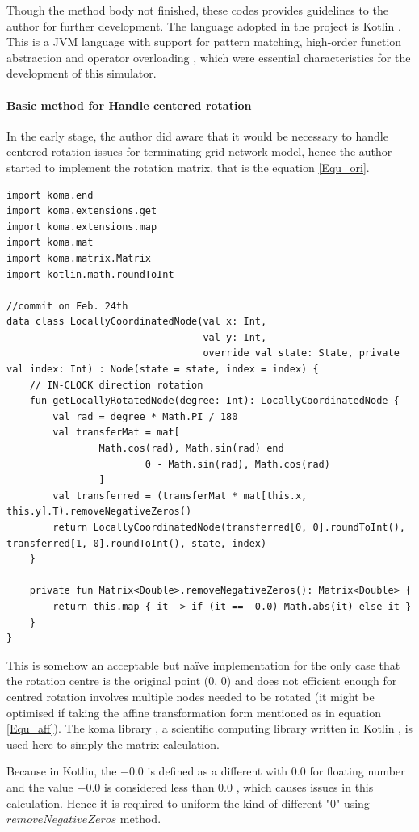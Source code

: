 \par\noindent
Though the method body not finished, these codes provides guidelines to the author for further development.
The language adopted in the project is Kotlin \cite{Kotlin}. This is a JVM language with support for pattern matching, high-order
function abstraction and operator overloading \cite{Kotlin}, which were essential characteristics for the development of this simulator.

\paragraph{Basic method for Handle centered rotation}
In the early stage, the author did aware that it would be necessary to handle centered rotation issues for terminating grid network model, hence
the author started to implement the rotation matrix, that is the equation \ref{Equ_ori}.

\begin{lstlisting}[caption = {Grid network interface (early screenshot)}, style = mykotlin]
import koma.end
import koma.extensions.get
import koma.extensions.map
import koma.mat
import koma.matrix.Matrix
import kotlin.math.roundToInt

//commit on Feb. 24th
data class LocallyCoordinatedNode(val x: Int,
                                  val y: Int,
                                  override val state: State, private val index: Int) : Node(state = state, index = index) {
    // IN-CLOCK direction rotation
    fun getLocallyRotatedNode(degree: Int): LocallyCoordinatedNode {
        val rad = degree * Math.PI / 180
        val transferMat = mat[
                Math.cos(rad), Math.sin(rad) end
                        0 - Math.sin(rad), Math.cos(rad)
                ]
        val transferred = (transferMat * mat[this.x, this.y].T).removeNegativeZeros()
        return LocallyCoordinatedNode(transferred[0, 0].roundToInt(), transferred[1, 0].roundToInt(), state, index)
    }

    private fun Matrix<Double>.removeNegativeZeros(): Matrix<Double> {
        return this.map { it -> if (it == -0.0) Math.abs(it) else it }
    }
}
\end{lstlisting}

\par\noindent
This is somehow an acceptable but naïve implementation for the only case that the rotation centre is the original point (0, 0)
and does not efficient enough for centred rotation involves multiple nodes needed to be rotated
(it might be optimised if taking the affine transformation form mentioned as in equation \ref{Equ_aff}).
The koma library , a scientific computing library written in Kotlin \cite{Koma}, is used here to simply the matrix calculation.
\par\noindent
Because in Kotlin, the $-0.0$ is defined as a different with $0.0$ for floating number and the value $-0.0$ is considered less than $0.0$ \cite{Kotlinfloat},
which causes issues in this calculation. Hence it is required to uniform the kind of different "$0$" using $removeNegativeZeros$ method.


